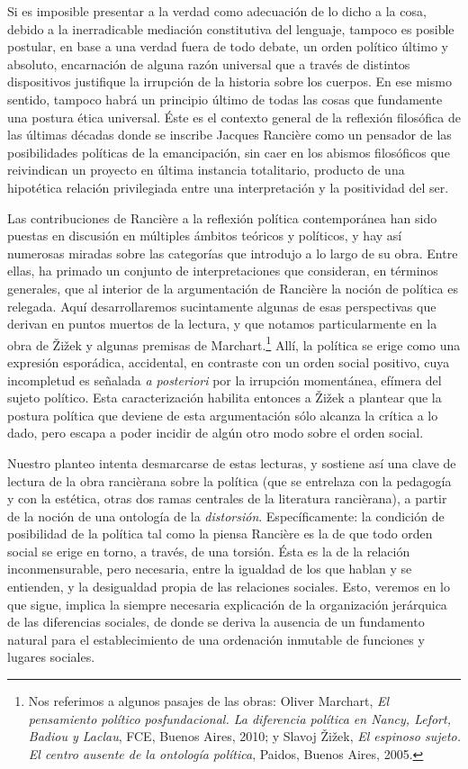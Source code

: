\documentclass{book}
\begin{document}
Si es imposible presentar a la verdad como adecuación de lo dicho a la
cosa, debido a la inerradicable mediación constitutiva del lenguaje,
tampoco es posible postular, en base a una verdad fuera de todo debate,
un orden político último y absoluto, encarnación de alguna razón
universal que a través de distintos dispositivos justifique la irrupción
de la historia sobre los cuerpos. En ese mismo sentido, tampoco habrá un
principio último de todas las cosas que fundamente una postura ética
universal. Éste es el contexto general de la reflexión filosófica de las
últimas décadas donde se inscribe Jacques Rancière como un pensador de
las posibilidades políticas de la emancipación, sin caer en los abismos
filosóficos que reivindican un proyecto en última instancia totalitario,
producto de una hipotética relación privilegiada entre una
interpretación y la positividad del ser.

Las contribuciones de Rancière a la reflexión política contemporánea han
sido puestas en discusión en múltiples ámbitos teóricos y políticos, y
hay así numerosas miradas sobre las categorías que introdujo a lo largo
de su obra. Entre ellas, ha primado un conjunto de interpretaciones que
consideran, en términos generales, que al interior de la argumentación
de Rancière la noción de política es relegada. Aquí desarrollaremos
sucintamente algunas de esas perspectivas que derivan en puntos muertos
de la lectura, y que notamos particularmente en la obra de Žižek y
algunas premisas de Marchart.\footnote{Nos referimos a algunos pasajes
  de las obras: Oliver Marchart, \emph{El pensamiento político
  posfundacional. La diferencia política en Nancy, Lefort, Badiou y
  Laclau}, FCE, Buenos Aires, 2010; y Slavoj Žižek, \emph{El espinoso
  sujeto. El centro ausente de la ontología política}, Paidos, Buenos
  Aires, 2005.} Allí, la política se erige como una expresión
esporádica, accidental, en contraste con un orden social positivo, cuya
incompletud es señalada \emph{a posteriori} por la irrupción momentánea,
efímera del sujeto político. Esta caracterización habilita entonces a
Žižek a plantear que la postura política que deviene de esta
argumentación sólo alcanza la crítica a lo dado, pero escapa a poder
incidir de algún otro modo sobre el orden social.

Nuestro planteo intenta desmarcarse de estas lecturas, y sostiene así
una clave de lectura de la obra rancièrana sobre la política (que se
entrelaza con la pedagogía y con la estética, otras dos ramas centrales
de la literatura rancièrana), a partir de la noción de una ontología de
la \emph{distorsión}. Específicamente: la condición de posibilidad de la
política tal como la piensa Rancière es la de que todo orden social se
erige en torno, a través, de una torsión. Ésta es la de la relación
inconmensurable, pero necesaria, entre la igualdad de los que hablan y
se entienden, y la desigualdad propia de las relaciones sociales. Esto,
veremos en lo que sigue, implica la siempre necesaria explicación de la
organización jerárquica de las diferencias sociales, de donde se deriva
la ausencia de un fundamento natural para el establecimiento de una
ordenación inmutable de funciones y lugares sociales.
\end{document}
